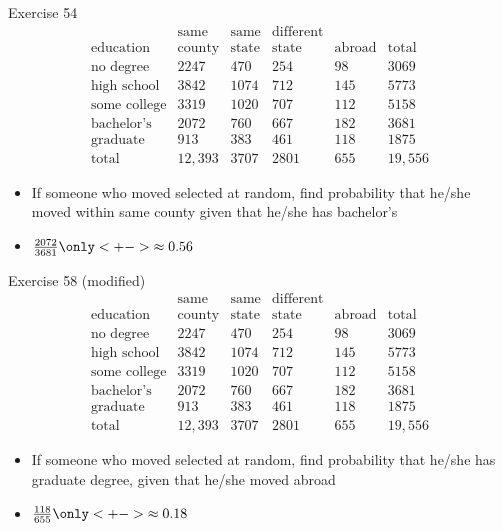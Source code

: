 \documentclass{beamer}
\theoremstyle{definition}
\begin{document}
\begin{frame}{Exercise 54}
\[\begin{array}{r|llll|l}
&\text{same}&\text{same}&\text{different}&&\\
\text{education}&\text{county}
&\text{state}&\text{state}&\text{abroad}&\text{total}\\\hline
\text{no degree}&2247&470&254&98&3069\\
\text{high school}&3842&1074&712&145&5773\\
\text{some college}&3319&1020&707&112&5158\\
\text{bachelor's}&2072&760&667&182&3681\\
\text{graduate}&913&383&461&118&1875\\\hline
\text{total}&12,393&3707&2801&655&19,556
\end{array}\]
\begin{itemize}
\item If someone who moved selected at random, find probability
that he/she moved within same county given that he/she has bachelor's
\item $\frac{2072}{3681}\only<+->{\approx 0.56}$
\end{itemize}
\end{frame}

\begin{frame}{Exercise 58 (modified)}
\[\begin{array}{r|llll|l}
&\text{same}&\text{same}&\text{different}&&\\
\text{education}&\text{county}
&\text{state}&\text{state}&\text{abroad}&\text{total}\\\hline
\text{no degree}&2247&470&254&98&3069\\
\text{high school}&3842&1074&712&145&5773\\
\text{some college}&3319&1020&707&112&5158\\
\text{bachelor's}&2072&760&667&182&3681\\
\text{graduate}&913&383&461&118&1875\\\hline
\text{total}&12,393&3707&2801&655&19,556
\end{array}\]
\begin{itemize}
\item If someone who moved selected at random, find probability
that he/she has graduate degree, given that he/she moved abroad
\item $\frac{118}{655}\only<+->{\approx 0.18}$
\end{itemize}
\end{frame}
\end{document}
